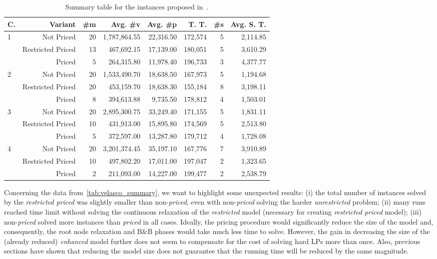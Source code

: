 \documentclass[smallextended]{svjour3}       %
\begin{document}
\begin{table}
\caption{Summary table for the instances proposed in~\cite{velasco:2019}.}
\begin{tabular}{lrrrrrrr}
\hline\hline
C. & Variant & \#m & Avg. \#v & Avg. \#p & T. T. & \#s & Avg. S. T. \\\hline
\multirow{3}{*}{1} & Not Priced & 20 & 1,787,864.55 & 22,316.50 & 172,574 & 5 & 2,114.85 \\
                   & Restricted Priced & 13 & 467,692.15 & 17,139.00 & 180,051 & 5 & 3,610.29 \\
\vspace{1.5mm}     & Priced & 5 & 264,315.80 & 11,978.40 & 196,733 & 3 & 4,377.77 \\
\multirow{3}{*}{2} & Not Priced & 20 & 1,533,490.70 & 18,638.50 & 167,973 & 5 & 1,194.68 \\
                   & Restricted Priced & 20 & 453,159.70 & 18,638.30 & 155,184 & 8 & 3,198.11 \\
\vspace{1.5mm}     & Priced & 8 & 394,613.88 & 9,735.50 & 178,812 & 4 & 1,503.01 \\
\multirow{3}{*}{3} & Not Priced & 20 & 2,895,300.75 & 33,249.40 & 171,155 & 5 & 1,831.11 \\
                   & Restricted Priced & 10 & 431,913.00 & 15,895.80 & 174,569 & 5 & 2,513.80 \\
\vspace{1.5mm}     & Priced & 5 & 372,597.00 & 13,287.80 & 179,712 & 4 & 1,728.08 \\
\multirow{3}{*}{4} & Not Priced & 20 & 3,201,374.45 & 35,197.10 & 167,776 & 7 & 3,910.89 \\
                   & Restricted Priced & 10 & 497,802.20 & 17,011.00 & 197,047 & 2 & 1,323.65 \\
                   & Priced & 2 & 211,093.00 & 14,227.00 & 199,477 & 2 & 2,538.79 \\\hline\hline
\end{tabular}
\label{tab:velasco_summary}
\end{table}

Concerning the data from~\autoref{tab:velasco_summary}, we want to highlight some unexpected results:
(i) the total number of instances solved by the \emph{restricted priced} was slightly smaller than non-\emph{priced}, even with non-\emph{priced} solving the harder \emph{unrestricted} problem;
(ii) many runs reached time limit without solving the continuous relaxation of the \emph{restricted} model (necessary for creating \emph{restricted priced} model);
(iii) non-\emph{priced} solved more instances than \emph{priced} in all cases.
Ideally, the pricing procedure would significantly reduce the size of the model and, consequently, the root node relaxation and B\&B phases would take much less time to solve.
However, the gain in decreasing the size of the (already reduced) \emph{enhanced} model further does not seem to compensate for the cost of solving hard LPs more than once.
Also, previous sections have shown that reducing the model size does not guarantee that the running time will be reduced by the same magnitude.
\end{document}
